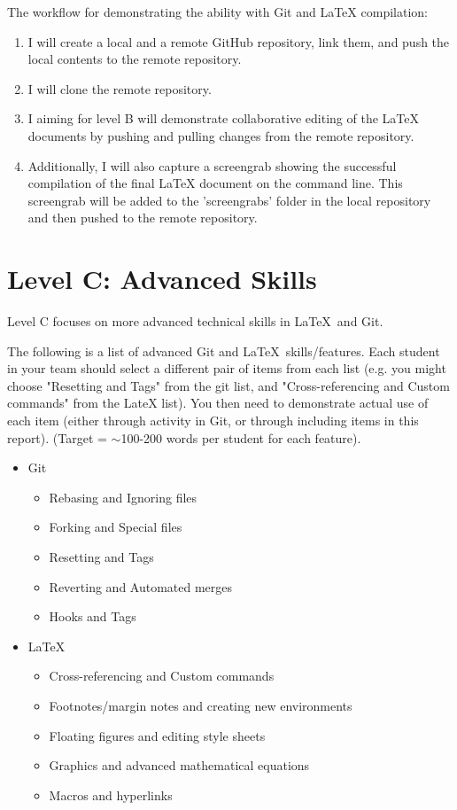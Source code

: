 \documentclass[a4paper, 11pt]{report}
\begin{document}
The workflow for demonstrating the ability with Git and LaTeX compilation:
\begin{enumerate}
\item I will create a local and a remote GitHub repository, link them, and push the local contents to the remote repository. 

\item I will clone the remote repository.

\item I aiming for level B will demonstrate collaborative editing of the LaTeX documents by pushing and pulling changes from the remote repository.

\item Additionally, I will also capture a screengrab showing the successful compilation of the final LaTeX document on the command line. This screengrab will be added to the 'screengrabs' folder in the local repository and then pushed to the remote repository.
\end{enumerate}


\newpage
\section{Level C: Advanced Skills}

Level C focuses on more advanced technical skills in \LaTeX\ and Git.

The following is a list of advanced Git and \LaTeX\ skills/features. Each student in your team should select a different pair of items from each list (e.g. you might choose "Resetting and Tags" from the git list, and "Cross-referencing and Custom commands" from the LateX list). You then need to demonstrate actual use of each item (either through activity in Git, or through including items in this report). (Target = $\sim$100-200 words per student for each feature).
\begin{itemize}
	\item Git
	\begin{itemize}
		\item Rebasing and Ignoring files
		\item Forking and Special files
		\item Resetting and Tags
		\item Reverting and Automated merges
		\item Hooks and Tags
	\end{itemize}
	\item \LaTeX\ 
	\begin{itemize}
		\item Cross-referencing and Custom commands
		\item Footnotes/margin notes and creating new environments
		\item Floating figures and editing style sheets
		\item Graphics and advanced mathematical equations
		\item Macros and hyperlinks
	\end{itemize}
\end{itemize}
\end{document}

